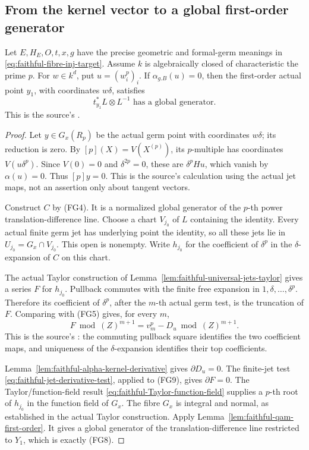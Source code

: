 \subsection{From the kernel vector to a global first-order generator}
\label{subsec:faithful-cocp-main}

\begin{srproposition}\label{prop:faithful-cocycle-p}
Let \(E,H_E,O,t,x,g\) have the precise geometric and
formal-germ meanings in
\eqref{eq:faithful-fibre-inj-target}.
Assume \(k\) is algebraically closed of characteristic
the prime \(p\).
For \(w\in k^d\), put \(u=(w_i^p)_i\).
If \(\alpha_{g.B}(u)=0\), then the first-order actual point
\(y_1\), with coordinates \(w\delta\), satisfies
\[
                         t_{y_1}^*L\otimes L^{-1}
                              \text{ has a global generator}.
 \tag{FG8}\label{eq:faithful-cocycle-p-conclusion}
\]
This is the source's .
\end{srproposition}
\begin{proof}
Let \(y\in G_x(R_p)\) be the actual germ point with coordinates
\(w\delta\); its reduction is zero.
By \([p](X)=V(X^{(p)})\), its \(p\)-multiple has coordinates
\(V(u\delta^p)\).
Since \(V(0)=0\) and \(\delta^{2p}=0\), these are
\(\delta^p Hu\), which vanish by \(\alpha(u)=0\).
Thus \([p]y=0\).
This is the source's  calculation using
the actual jet maps, not an assertion only about tangent vectors.

Construct \(C\) by (FG4).
It is a normalized global generator of the \(p\)-th power
translation-difference line.
Choose a chart \(V_{j_0}\) of \(L\) containing the identity.
Every actual finite germ jet has underlying point the
identity, so all these jets lie in \(U_{j_0}=G_x\cap V_{j_0}\).
This open is nonempty.
Write \(h_{j_0}\) for the coefficient of \(\delta^p\)
in the \(\delta\)-expansion of \(C\) on this chart.

The actual Taylor construction of
Lemma~\ref{lem:faithful-universal-jets-taylor} gives a series
\(F\) for \(h_{j_0}\).
Pullback commutes with the finite free expansion in
\(1,\delta,\ldots,\delta^p\).
Therefore its coefficient of \(\delta^p\), after the
\(m\)-th actual germ test, is the truncation of \(F\).
Comparing with (FG5) gives, for every \(m\),
\[
                  F\bmod(Z)^{m+1}
                       =v_m^p-D_u\bmod(Z)^{m+1}.
 \tag{FG9}\label{eq:faithful-C-top-Taylor}
\]
This is the source's :
the commuting pullback square identifies the two coefficient
maps, and uniqueness of the \(\delta\)-expansion identifies
their top coefficients.

Lemma~\ref{lem:faithful-alpha-kernel-derivative} gives
\(\partial D_u=0\).
The finite-jet test \eqref{eq:faithful-jet-derivative-test},
applied to (FG9), gives \(\partial F=0\).
The Taylor/function-field result
\eqref{eq:faithful-Taylor-function-field} supplies a
\(p\)-th root of \(h_{j_0}\) in the function field of \(G_x\).
The fibre \(G_x\) is integral and normal, as established
in the actual Taylor construction.
Apply Lemma~\ref{lem:faithful-qam-first-order}.
It gives a global generator of the translation-difference
line restricted to \(Y_1\), which is exactly (FG8).
\end{proof}

